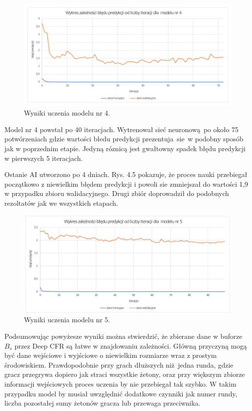 \documentclass[12pt,oneside,a4paper]{report}
\begin{document}
\begin{figure}[!ht]
  \centering
  \includegraphics[width=1\textwidth]{./img/model4.pdf}
\caption{Wyniki uczenia modelu nr 4.}
\end{figure}

Model nr 4 powstał po 40 iteracjach. Wytrenował sieć neuronową po około 75 potwórzeniach gdzie 
wartości błedu predykcji prezentuja sie w podobny sposób jak w poprzednim etapie. Jedyną róznicą
jest gwałtowny spadek błędu predykcji w pierwszych 5 iteracjach.

Ostanie AI utworzono po 4 dniach. Rys. 4.5 pokazuje, że proces nauki przebiegał początkowo z 
niewielkim błędem predykcji i powoli sie zmniejszał do wartości 1,9 w przypadku zbioru walidacyjnego.
Drugi zbiór doprowadził do podobnych rezoltatów jak we wszystkich etapach.

\begin{figure}[!ht]
  \centering
  \includegraphics[width=1\textwidth]{./img/model5.pdf}
\caption{Wyniki uczenia modelu nr 5.}
\end{figure}

Podsumowując powyżesze wyniki można stwierdzić, że zbierane dane w buforze $B_{s}$
przez Deep CFR są łatwe w znajdowaniu zależności. Główną przyczyną mogą być dane 
wejściowe i wyjściowe o niewielkim rozmiarze wraz z prostym środowiskiem.
Prawdopodobnie przy grach dłuższych niż jedna runda, gdzie gracz przegrywa dopiero jak straci 
wszystkie żetony, oraz przy większym zbiorze informacji wejściowych proces uczenia by nie 
przebiegał tak szybko. W takim przypadku model by musiał uwzględnić dodatkowe czynniki jak 
numer rundy, liczba pozostałej sumy żetonów gracza lub przewaga przeciwnika. 
\end{document}
